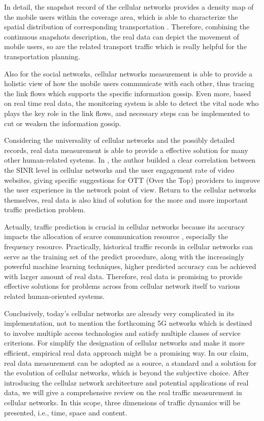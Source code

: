 In detail, the snapshot record of the cellular networks provides a density map of the mobile users within the coverage area, which is able to characterize the spatial distribution of corresponding transportation \cite{caceres2012traffic}. Therefore, combining the continuous snapshots description, the real data can depict the movement of mobile users, so are the related transport traffic which is really helpful for the transportation planning.

Also for the social networks, cellular networks measurement is able to provide a holistic view of how the mobile users communicate with each other, thus tracing the link flows which supports the specific information gossip. Even more, based on real time real data, the monitoring system is able to detect the vital node who plays the key role in the link flows, and necessary steps can be implemented to cut or weaken the information gossip.

Considering the universality of cellular networks and the possibly detailed records, real data measurement is able to provide a effective solution for many other human-related systems. In \cite{shafiq2014understanding}, the author builded a clear correlation between the SINR level in cellular networks and the user engagement rate of video websites, giving specific suggestions for OTT (Over the Top) providers to improve the user experience in the network point of view. Return to the cellular networks themselves, real data is also kind of solution for the more and more important traffic prediction problem.

Actually, traffic prediction is crucial in cellular networks because its accuracy impacts the allocation of scarce communication resource \cite{tan2008empirical}, especially the frequency resource. Practically, historical traffic records in cellular networks can serve as the training set of the predict procedure, along with the increasingly powerful machine learning techniques, higher predicted accuracy can be achieved with larger amount of real data. Therefore, real data is promising to provide effective solutions for problems across from cellular network itself to various related human-oriented systems.

Conclusively, today's cellular networks are already very complicated in its implementation, not to mention the forthcoming 5G networks which is destined to involve multiple access technologies and satisfy multiple classes of service criterions. For simplify the designation of cellular networks and make it more efficient, empirical real data approach might be a promising way. In our claim, real data measurement can be adopted as a source, a standard and a solution for the evolution of cellular networks, which is beyond the subjective choice. After introducing the cellular network architecture and potential applications of real data, we will give a comprehensive review on the real traffic measurement in cellular networks. In this scope, three dimensions of traffic dynamics will be presented, i.e., time, space and content.

